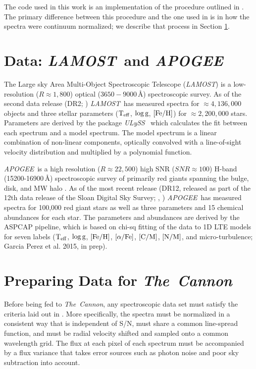 \documentclass[12pt, preprint]{aastex}
\newcommand{\tc}{\textsl{The~Cannon}}
\newcommand{\apogee}{\textsl{APOGEE}}
\newcommand{\lamost}{\textsl{LAMOST}}
\newcommand{\ulyss}{\textsl{ULySS}}
\newcommand{\teff}{\mbox{$\rm T_{eff}$}}
\newcommand{\feh}{\mbox{$\rm [Fe/H]$}}
\newcommand{\alphafe}{\mbox{$\rm [\alpha/Fe]$}}
\newcommand{\logg}{\mbox{$\rm \log g$}}
\newcommand{\cm}{\mbox{$\rm [C/M]$}}
\newcommand{\nm}{\mbox{$\rm [N/M]$}}
\begin{document}
The code used in this work is an implementation of the procedure outlined in 
\citet{ness2015}. The primary difference between this procedure and the one used
in \citet{ness2015} is in how the spectra were continuum normalized; we
describe that process in Section \ref{sec:data}. 

\section{Data: \lamost\ and \apogee}\label{sec:data}

The Large sky Area Multi-Object Spectroscopic Telescope (\lamost) 
is a low-resolution ($R\approx1,800$) optical ($3650-9000\,\mbox{\AA}$) 
spectroscopic survey.
As of the second data release (DR2; \citet{Luo2015}) \lamost\ has 
measured spectra for $\approx 4,136,000$ objects and 
three stellar parameters (\teff, \logg, \feh) for $\approx 2,200,000$ stars. 
Parameters are derived by
the package \ulyss\ \citep{Wu2011} which calculates the fit between each spectrum and a 
model spectrum. The model spectrum is a linear combination of non-linear components,
optically convolved with a line-of-sight velocity
distribution and multiplied by a polynomial function. 

\apogee\ is a high resolution ($R\approx22,500$) high SNR ($SNR\approx100$) 
H-band (15200-16900\,$\mbox{\AA}$) spectroscopic survey of 
primarily red giants spanning the bulge, disk, and MW halo \citep{Zaso2013}.
As of the most recent release (DR12, released as part of the 12th data release
of the Sloan Digital Sky Survey; \citet{Majewski2015}, \citet{Eisenstein2011}) 
\apogee\ has measured spectra
for 100,000 red giant stars as well as three parameters and 15 chemical
abundances for each star. The parameters and abundances are 
derived by the ASPCAP pipeline, which is based on chi-sq fitting of
the data to 1D LTE models for seven labels (\teff, \logg, \feh, \alphafe, \cm, \nm, 
and micro-turbulence; Garcia Perez et al. 2015, in prep). 

\section{Preparing Data for \tc} 

Before being fed to \tc, any spectroscopic data set must satisfy the criteria laid out in 
\citet{ness2015}. More specifically, the spectra must be normalized in a consistent way
that is independent of S/N, must share a
common line-spread function, and must be radial velocity shifted and sampled onto
a common wavelength grid. The flux at each pixel of each spectrum must be accompanied
by a flux variance that takes error sources such as photon noise and poor sky subtraction
into account. 
\end{document}
